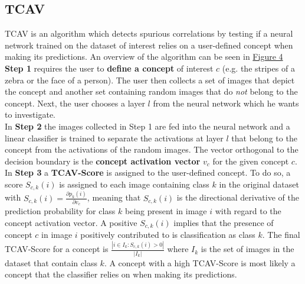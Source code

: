 \documentclass{article}
\begin{document}
\subsection{TCAV}
TCAV \cite{pmlr-v80-kim18d} is an algorithm which detects spurious correlations by testing if a neural network trained on the dataset of interest relies on a user-defined concept when making its predictions. An overview of the algorithm can be seen in \hyperref[fig:tcav]{Figure 4} \\
\textbf{Step 1} requires the user to \textbf{define a concept} of interest $c$ (e.g. the stripes of a zebra or the face of a person). The user then collects a set of images that depict the concept and another set containing random images that do \textit{not} belong to the concept. Next, the user chooses a layer $l$ from the neural network which he wants to investigate. \\
In \textbf{Step 2} the images collected in Step 1 are fed into the neural network and a linear classifier is trained to separate the activations at layer $l$ that belong to the concept from the activations of the random images. The vector orthogonal to the decision boundary is the \textbf{concept activation vector} $v_c$ for the given concept $c$.  \\
In \textbf{Step 3} a \textbf{TCAV-Score} is assigned to the user-defined concept. To do so, a score $S_{c,k}(i)$ is assigned to each image containing class $k$ in the original dataset with $S_{c,k}(i) = \frac{\partial p_k(i)}{\partial v_c}$, meaning that $S_{c,k}(i)$ is the directional derivative of the prediction probability for class $k$ being present in image $i$ with regard to the concept activation vector. A positive $S_{c,k}(i)$ implies that the presence of concept $c$ in image $i$ positively contributed to is classification as class $k$.
The final TCAV-Score for a concept is $\frac{|i \in I_k: S_{c,k}(i) > 0 |}{|I_k|}$ where $I_k$ is the set of images in the dataset that contain class $k$. A concept with a high TCAV-Score is most likely a concept that the classifier relies on when making its predictions. \\
\end{document}
